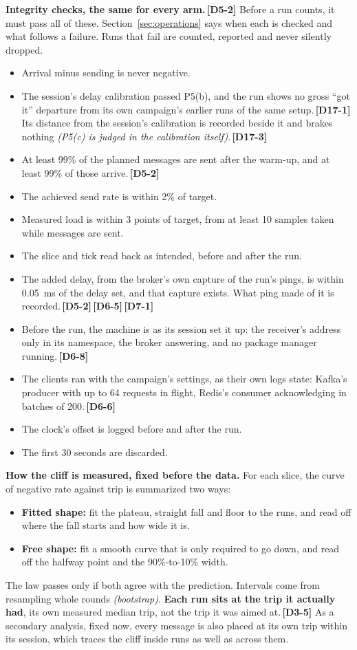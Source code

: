 \documentclass[11pt]{article}
\newcommand{\gl}[1]{{\color{soft}\itshape\small (#1)}}
\newcommand{\chgold}[1]{\,{\color{oldcol}\bfseries\footnotesize[#1]}}
\begin{document}
\textbf{Integrity checks, the same for every arm.}\chgold{D5-2} Before a run counts, it must pass all of these. Section~\ref{sec:operations} says when each is checked and what follows a failure. Runs that fail are counted, reported and never silently dropped.
\begin{itemize}
  \item Arrival minus sending is never negative.
  \item The session's delay calibration passed P5(b), and the run shows no gross ``got it'' departure from its own campaign's earlier runs of the same setup.\chgold{D17-1} Its distance from the session's calibration is recorded beside it and brakes nothing \gl{P5(c) is judged in the calibration itself}.\chgold{D17-3}
  \item At least 99\% of the planned messages are sent after the warm-up, and at least 99\% of those arrive.\chgold{D5-2}
  \item The achieved send rate is within 2\% of target.
  \item Measured load is within 3 points of target, from at least 10 samples taken while messages are sent.
  \item The slice and tick read back as intended, before and after the run.
  \item The added delay, from the broker's own capture of the run's pings, is within 0.05~ms of the delay set, and that capture exists. What ping made of it is recorded.\chgold{D5-2}\chgold{D6-5}\chgold{D7-1}
  \item Before the run, the machine is as its session set it up: the receiver's address only in its namespace, the broker answering, and no package manager running.\chgold{D6-8}
  \item The clients ran with the campaign's settings, as their own logs state: Kafka's producer with up to 64 requests in flight, Redis's consumer acknowledging in batches of 200.\chgold{D6-6}
  \item The clock's offset is logged before and after the run.
  \item The first 30 seconds are discarded.
\end{itemize}

\textbf{How the cliff is measured, fixed before the data.} For each slice, the curve of negative rate against trip is summarized two ways:
\begin{itemize}
  \item \textbf{Fitted shape:} fit the plateau, straight fall and floor to the runs, and read off where the fall starts and how wide it is.
  \item \textbf{Free shape:} fit a smooth curve that is only required to go down, and read off the halfway point and the 90\%-to-10\% width.
\end{itemize}
The law passes only if both agree with the prediction. Intervals come from resampling whole rounds \gl{bootstrap}. \textbf{Each run sits at the trip it actually had}, its own measured median trip, not the trip it was aimed at.\chgold{D3-5} As a secondary analysis, fixed now, every message is also placed at its own trip within its session, which traces the cliff inside runs as well as across them.
\end{document}
